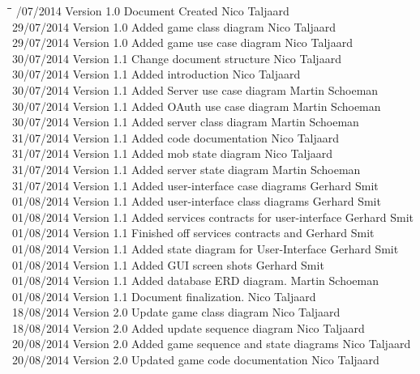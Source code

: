 \documentclass[letterpaper]{article}
\begin{document}
		\begin{tabbing}
			\hspace*{2.5cm}\=\hspace*{2.5cm}\=\hspace*{8cm}\=\hspace*{3cm} /07/2014	\> Version 1.0	\> Document Created 							\> Nico Taljaard \\
			29/07/2014	\> Version 1.0	\> Added game class diagram						\> Nico Taljaard \\
			29/07/2014	\> Version 1.0	\> Added game use case diagram					\> Nico Taljaard \\
			30/07/2014	\> Version 1.1	\> Change document structure					\> Nico Taljaard \\
			30/07/2014	\> Version 1.1	\> Added introduction							\> Nico Taljaard \\
			30/07/2014  \> Version 1.1  \> Added Server use case diagram				\> Martin Schoeman\\
			30/07/2014  \> Version 1.1  \> Added OAuth use case diagram					\> Martin Schoeman\\
			30/07/2014  \> Version 1.1  \> Added server class diagram					\> Martin Schoeman\\
			31/07/2014  \> Version 1.1  \> Added code documentation						\> Nico Taljaard\\
			31/07/2014  \> Version 1.1  \> Added mob state diagram						\> Nico Taljaard\\
			31/07/2014  \> Version 1.1  \> Added server state diagram					\> Martin Schoeman\\
			31/07/2014  \> Version 1.1  \> Added user-interface case diagrams			\> Gerhard Smit\\
			01/08/2014  \> Version 1.1  \> Added user-interface class diagrams			\> Gerhard Smit\\
			01/08/2014  \> Version 1.1  \> Added services contracts for user-interface 	\> Gerhard Smit\\
			01/08/2014  \> Version 1.1  \> Finished off services contracts and 			\> Gerhard Smit\\
			01/08/2014	\> Version 1.1	\> Added state diagram for User-Interface 		\> Gerhard Smit\\
			01/08/2014  \> Version 1.1  \> Added GUI screen shots						\> Gerhard Smit\\
			01/08/2014  \> Version 1.1  \> Added database ERD diagram.					\> Martin Schoeman\\
			01/08/2014  \> Version 1.1  \> Document finalization.						\> Nico Taljaard\\
			18/08/2014  \> Version 2.0  \> Update game class diagram					\> Nico Taljaard\\
			18/08/2014  \> Version 2.0  \> Added update sequence diagram				\> Nico Taljaard\\
			20/08/2014  \> Version 2.0  \> Added game sequence and state diagrams		\> Nico Taljaard\\
			20/08/2014  \> Version 2.0  \> Updated game code documentation				\> Nico Taljaard\\
		\end{tabbing}
		
\end{document}
